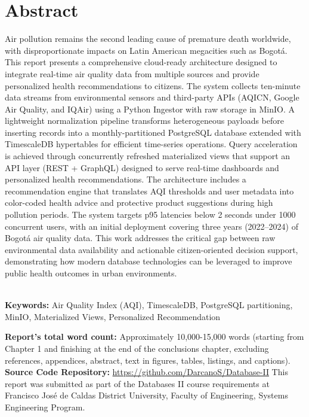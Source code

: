 \chapter*{\center \Large  Abstract}

Air pollution remains the second leading cause of premature death worldwide, with disproportionate impacts on Latin American megacities such as Bogotá. This report presents a comprehensive cloud-ready architecture designed to integrate real-time air quality data from multiple sources and provide personalized health recommendations to citizens. The system collects ten-minute data streams from environmental sensors and third-party APIs (AQICN, Google Air Quality, and IQAir) using a Python Ingestor with raw storage in MinIO. A lightweight normalization pipeline transforms heterogeneous payloads before inserting records into a monthly-partitioned PostgreSQL database extended with TimescaleDB hypertables for efficient time-series operations. Query acceleration is achieved through concurrently refreshed materialized views that support an API layer (REST + GraphQL) designed to serve real-time dashboards and personalized health recommendations. The architecture includes a recommendation engine that translates AQI thresholds and user metadata into color-coded health advice and protective product suggestions during high pollution periods. The system targets p95 latencies below 2 seconds under 1000 concurrent users, with an initial deployment covering three years (2022–2024) of Bogotá air quality data. This work addresses the critical gap between raw environmental data availability and actionable citizen-oriented decision support, demonstrating how modern database technologies can be leveraged to improve public health outcomes in urban environments.

~\\[1cm]
\noindent %
\textbf{Keywords:} Air Quality Index (AQI), TimescaleDB, PostgreSQL partitioning, MinIO, Materialized Views, Personalized Recommendation

\vfill
\noindent
\textbf{Report's total word count:} Approximately 10,000-15,000 words (starting from Chapter 1 and finishing at the end of the conclusions chapter, excluding references, appendices, abstract, text in figures, tables, listings, and captions). \newline
\newline
\noindent
\textbf{Source Code Repository:} \url{https://github.com/DarcanoS/Database-II} \newline
\newline
This report was submitted as part of the Databases II course requirements at Francisco José de Caldas District University, Faculty of Engineering, Systems Engineering Program.

